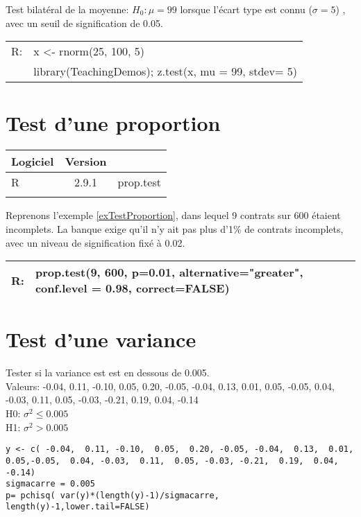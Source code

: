 \begin{ex}
Test bilat\'eral de la moyenne:  $H_0: \mu= 99$ lorsque l'\'ecart type est connu ($\sigma = 5$) , avec un seuil de signification de 0.05.

\begin{tabular}{|rl|}
\hline
	R:  & x <- rnorm(25, 100, 5)\\
	    & library(TeachingDemos); z.test(x, mu = 99, stdev= 5)\\
\hline
\end{tabular}
\end{ex}

\section{Test d'une proportion}
\begin{tabular}{lc|l}
	Logiciel & Version \\
	\hline
	R & 2.9.1 & prop.test\\
\\
\end{tabular}

\begin{ex}
Reprenons l'exemple \ref{exTestProportion}, dans lequel 9 contrats sur 600 \'etaient incomplets. La banque exige qu'il n'y ait pas plus d'1\% de contrats incomplets, avec un niveau de signification fix\'e \`a 0.02. 

\begin{tabular}{|rl|}
\hline
	R:  & prop.test(9, 600, p=0.01, alternative="greater", conf.level = 0.98, correct=FALSE)\\
\hline
\end{tabular}
\end{ex}

\section{Test d'une variance}
 
\begin{ex}
Tester si la variance est est en dessous de 0.005.\\
Valeurs: -0.04,  0.11, -0.10,  0.05,  0.20, -0.05, -0.04,  0.13,  0.01,  0.05, -0.05,  0.04, -0.03,  0.11,  0.05, -0.03, -0.21,  0.19,  0.04, -0.14\\
H0: $\sigma^2\leq 0.005$\\
H1: $\sigma^2> 0.005$

\begin{verbatim}
y <- c( -0.04,  0.11, -0.10,  0.05,  0.20, -0.05, -0.04,  0.13,  0.01,  0.05,-0.05,  0.04, -0.03,  0.11,  0.05, -0.03, -0.21,  0.19,  0.04, -0.14)
sigmacarre = 0.005
p= pchisq( var(y)*(length(y)-1)/sigmacarre, length(y)-1,lower.tail=FALSE)
\end{verbatim}
\end{ex}

